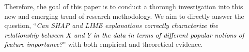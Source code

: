 \documentclass[mnsc,blindrev]{informs3}
\begin{document}
 


Therefore, the goal of this paper is to conduct a thorough investigation into this new and emerging trend of research methodology. We aim to directly answer the question, 
``\emph{Can SHAP and LIME explanations \textcolor{black}{correctly characterize the relationship between $X$ and $Y$ in the data in terms of different popular notions of feature importance?}}''
with both empirical and theoretical evidence.  
\end{document}
